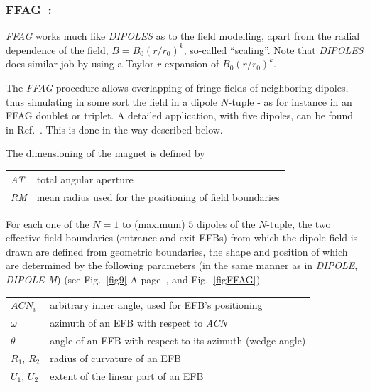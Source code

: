 \newpage


\subsubsection*{FFAG~: \FFAGTitl~\cite{reportNIMFFAG,reportICFAFFAG}} \label{FFAG} 
\medskip

\noindent \textsl{FFAG}  works much like \textsl{DIPOLES} 
as to the field modelling, apart from the  radial dependence of the field, $B=B_0(r/r_0)^k$, so-called ``scaling''. 
Note that \textsl{DIPOLES} does similar job by using a Taylor $r$-expansion of $B_0(r/r_0)^k$. 

\medskip

\noindent The \textsl{FFAG} procedure allows overlapping of fringe fields of neighboring dipoles, 
thus simulating in some sort the field in a dipole $N$-tuple - as for instance in an FFAG doublet 
or triplet. A detailed application, with 
five dipoles, can be found in Ref.~\cite{reportNIMFFAG}. This is done in the way described below. 

\medskip

\noindent  The dimensioning of the magnet is defined by

\medskip

 \begin{tabular}{>{\sl}l!{~:}l}
	 AT &  total angular aperture \\
	 RM & mean radius used for the positioning of field boundaries\\
 \end{tabular}

\medskip

\noindent For each one of the $N=1$ to (maximum) $5$ dipoles of the  $N$-tuple, 
the two  effective field boundaries (entrance and exit EFBs) from which  the dipole field  is drawn are
defined from geometric boundaries, the shape and position of which are determined by the 
following parameters (in the same manner as in \textsl{DIPOLE}, \textsl{DIPOLE-M})
 (see Fig.~\ref{fig9}-A page~\pageref{fig9}, and Fig.~\ref{figFFAG}) 

\medskip

\begin{tabular}{l!{~:}l}
	$ACN_i$  & arbitrary inner angle, used for EFB's positioning  \\
	$\omega$ &  azimuth of an EFB with respect to  \textsl{ACN}\\
	$\theta$ & angle of an EFB with respect to its azimuth (wedge angle)\\ 
	$R_1$, $R_2$  &  radius of curvature of an EFB\\
	$U_1$, $U_2$  &  extent of the linear part of an EFB  \\
\end{tabular}

